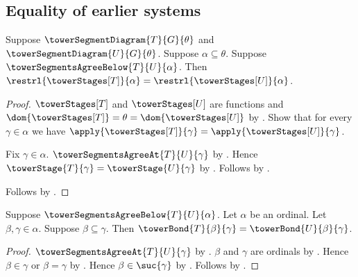 \subsection{Equality of earlier systems}

\begin{proposition}\label{tower_agreement_stage_restrictions}
    Suppose $\towerSegmentDiagram{T}{G}{\theta}$ and
        $\towerSegmentDiagram{U}{G}{\theta}$.
    Suppose $\alpha\subseteq\theta$.
    Suppose $\towerSegmentsAgreeBelow{T}{U}{\alpha}$.
    Then $\restrl{\towerStages[T]}{\alpha}=
        \restrl{\towerStages[U]}{\alpha}$.
\end{proposition}
\begin{proof}
    $\towerStages[T]$ and $\towerStages[U]$ are functions and
        $\dom{\towerStages[T]}=\theta=\dom{\towerStages[U]}$ by
        .
    Show that for every $\gamma\in\alpha$ we have
        $\apply{\towerStages[T]}{\gamma}=
        \apply{\towerStages[U]}{\gamma}$.
    \begin{subproof}
        Fix $\gamma\in\alpha$.
        $\towerSegmentsAgreeAt{T}{U}{\gamma}$ by
            .
        Hence $\towerStage{T}{\gamma}=\towerStage{U}{\gamma}$ by
            .
        Follows by .
    \end{subproof}
    Follows by .
\end{proof}

\begin{proposition}\label{tower_agreement_bond_value}
    Suppose $\towerSegmentsAgreeBelow{T}{U}{\alpha}$.
    Let $\alpha$ be an ordinal.
    Let $\beta,\gamma\in\alpha$.
    Suppose $\beta\subseteq\gamma$.
    Then $\towerBond{T}{\beta}{\gamma}=
        \towerBond{U}{\beta}{\gamma}$.
\end{proposition}
\begin{proof}
    $\towerSegmentsAgreeAt{T}{U}{\gamma}$ by
        .
    $\beta$ and $\gamma$ are ordinals by
        .
    Hence $\beta\in\gamma$ or $\beta=\gamma$ by
        .
    Hence $\beta\in\suc{\gamma}$ by .
    Follows by .
\end{proof}

